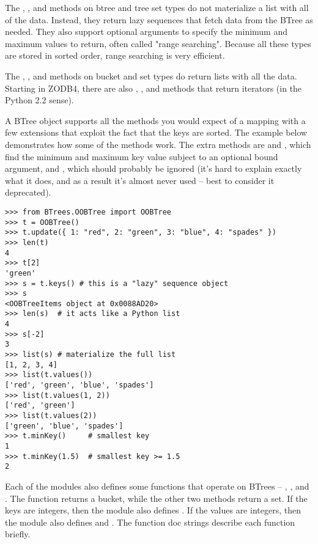 The , , and 
methods on btree and tree set types do not materialize a list with all
of the data.  Instead, they return lazy sequences that fetch data
from the BTree as needed.  They also support optional arguments to
specify the minimum and maximum values to return, often called "range
searching".  Because all these types are stored in sorted order, range
searching is very efficient.

The , , and 
methods on bucket and set types do return lists with all the data.
Starting in ZODB4, there are also ,
, and  methods that
return iterators (in the Python 2.2 sense).

A BTree object supports all the methods you would expect of a mapping
with a few extensions that exploit the fact that the keys are sorted.
The example below demonstrates how some of the methods work.  The
extra methods are  and , which
find the minimum and maximum key value subject to an optional bound
argument, and , which should probably be ignored
(it's hard to explain exactly what it does, and as a result it's
almost never used -- best to consider it deprecated).

\begin{verbatim}
>>> from BTrees.OOBTree import OOBTree
>>> t = OOBTree()
>>> t.update({ 1: "red", 2: "green", 3: "blue", 4: "spades" })
>>> len(t)
4
>>> t[2]
'green'
>>> s = t.keys() # this is a "lazy" sequence object
>>> s
<OOBTreeItems object at 0x0088AD20>
>>> len(s)  # it acts like a Python list
4
>>> s[-2]
3
>>> list(s) # materialize the full list
[1, 2, 3, 4]
>>> list(t.values())
['red', 'green', 'blue', 'spades']
>>> list(t.values(1, 2))
['red', 'green']
>>> list(t.values(2))
['green', 'blue', 'spades']
>>> t.minKey()     # smallest key
1
>>> t.minKey(1.5)  # smallest key >= 1.5
2
\end{verbatim}

Each of the modules also defines some functions that operate on
BTrees -- , , and
.  The  function returns
a bucket, while the other two methods return a set.
If the keys are integers, then the module also defines
.  If the values are integers, then the module
also defines  and
.  The function doc strings describe each
function briefly.

